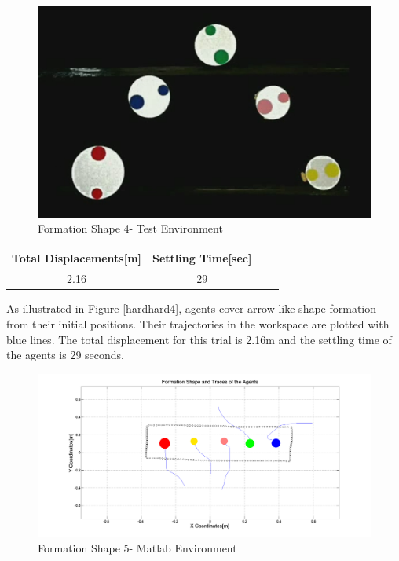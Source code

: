 \begin{figure}[H]
\caption{Formation Shape 4- Test Environment}
\centerline{\includegraphics[scale = 0.35]{6_real_hardware}}
\end{figure} 
					
\begin{center}
 \label{hardwareshape4_ref} 
\begin{tabular}{||c| c |c |c ||}
\hline
Total Displacements[m]  & Settling Time[sec]\\ 
\hline
2.16 & 29 \\
\hline
\end{tabular}
\end{center}

As illustrated in Figure \ref{hardhard4}, agents cover arrow like shape formation from their initial positions. Their trajectories in the workspace are plotted with blue lines. The total displacement for this trial is 2.16m and the settling time of the agents is 29 seconds.	
		
\begin{figure}[H]
\caption{Formation Shape 5- Matlab Environment} \label{hardhard5}
\centerline{\includegraphics[scale = 0.32]{9_hardware}}
\end{figure} 
					
